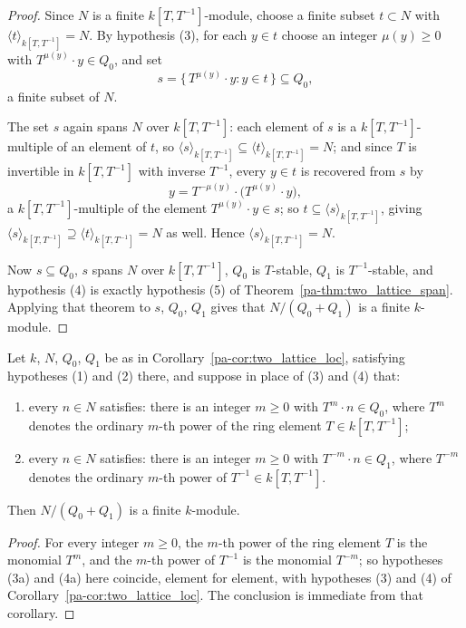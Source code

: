 \begin{proof}
  \leanok
  Since \(N\) is a finite \(k[T,T^{-1}]\)-module, choose a finite subset \(t \subset N\) with
  \(\langle t \rangle_{k[T,T^{-1}]} = N\). By hypothesis (3), for each \(y \in t\) choose an
  integer \(\mu(y) \ge 0\) with \(T^{\mu(y)} \cdot y \in Q_0\), and set
  \[
    s = \{\, T^{\mu(y)} \cdot y : y \in t \,\} \subseteq Q_0 ,
  \]
  a finite subset of \(N\).

  The set \(s\) again spans \(N\) over \(k[T,T^{-1}]\): each element of \(s\) is a
  \(k[T,T^{-1}]\)-multiple of an element of \(t\), so
  \(\langle s \rangle_{k[T,T^{-1}]} \subseteq \langle t \rangle_{k[T,T^{-1}]} = N\); and since
  \(T\) is invertible in \(k[T,T^{-1}]\) with inverse \(T^{-1}\), every \(y \in t\) is
  recovered from \(s\) by
  \[
    y = T^{-\mu(y)} \cdot \bigl(T^{\mu(y)} \cdot y\bigr) ,
  \]
  a \(k[T,T^{-1}]\)-multiple of the element \(T^{\mu(y)} \cdot y \in s\); so
  \(t \subseteq \langle s \rangle_{k[T,T^{-1}]}\), giving
  \(\langle s \rangle_{k[T,T^{-1}]} \supseteq \langle t \rangle_{k[T,T^{-1}]} = N\) as well.
  Hence \(\langle s \rangle_{k[T,T^{-1}]} = N\).

  Now \(s \subseteq Q_0\), \(s\) spans \(N\) over \(k[T,T^{-1}]\), \(Q_0\) is \(T\)-stable,
  \(Q_1\) is \(T^{-1}\)-stable, and hypothesis (4) is exactly hypothesis (5) of
  Theorem~\ref{pa-thm:two_lattice_span}. Applying that theorem to \(s\), \(Q_0\), \(Q_1\) gives
  that \(N/(Q_0+Q_1)\) is a finite \(k\)-module.
\end{proof}

\begin{corollary}
  \label{pa-cor:two_lattice_loc_pow}
  \leanok

  Let \(k\), \(N\), \(Q_0\), \(Q_1\) be as in Corollary~\ref{pa-cor:two_lattice_loc}, satisfying
  hypotheses (1) and (2) there, and suppose in place of (3) and (4) that:
  \begin{enumerate}
    \item[(3a)] every \(n \in N\) satisfies: there is an integer \(m \ge 0\) with
      \(T^m \cdot n \in Q_0\), where \(T^m\) denotes the ordinary \(m\)-th power of the ring
      element \(T \in k[T,T^{-1}]\);
    \item[(4a)] every \(n \in N\) satisfies: there is an integer \(m \ge 0\) with
      \(T^{-m} \cdot n \in Q_1\), where \(T^{-m}\) denotes the ordinary \(m\)-th power of
      \(T^{-1} \in k[T,T^{-1}]\).
  \end{enumerate}
  Then \(N / (Q_0 + Q_1)\) is a finite \(k\)-module.
\end{corollary}
\begin{proof}
  \leanok
  For every integer \(m \ge 0\), the \(m\)-th power of the ring element \(T\) is the monomial
  \(T^m\), and the \(m\)-th power of \(T^{-1}\) is the monomial \(T^{-m}\); so hypotheses
  (3a) and (4a) here coincide, element for element, with hypotheses (3) and (4) of
  Corollary~\ref{pa-cor:two_lattice_loc}. The conclusion is immediate from that corollary.
\end{proof}

